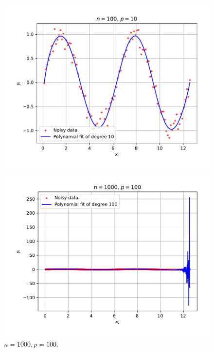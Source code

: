 \begin{figure}[h]
	\centering
	\begin{minipage}{0.495\textwidth}
		\centering
		\includegraphics[width=\textwidth]{IMAGENES/n_100_p_10.pdf}
		\caption{$n=100, p=10$.}
	\end{minipage}
	\hfill
	\begin{minipage}{0.495\textwidth}
		\centering
		\includegraphics[width=\textwidth]{IMAGENES/n_1000_p_100.pdf}
		\caption{$n=1000, p=100$.}
	\end{minipage}
\end{figure}

